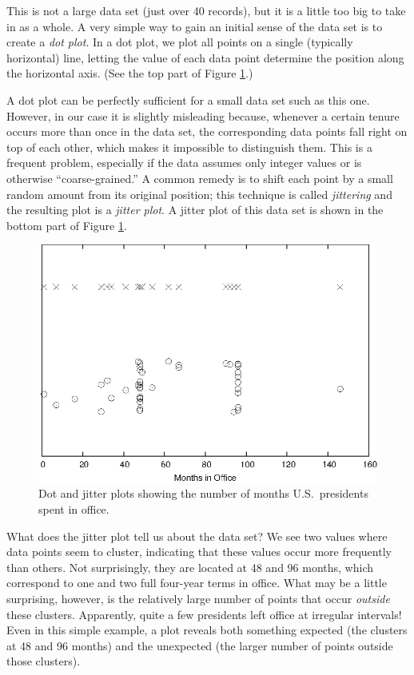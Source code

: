 This is not a large data set (just over 40 records), but it is a
little too big to take in as a whole. A very simple way to gain an
initial sense of the data set is to create a \emph{dot plot}. In a dot
plot, we plot all points on a single (typically horizontal) line,
letting the value of each data point determine the position along the
horizontal axis.  (See the top part of Figure \ref{fig:presidents}.)

A dot plot can be perfectly sufficient for a small data set such as
this one. However, in our case it is slightly misleading because,
whenever a certain tenure occurs more than once in the data set, the
corresponding data points fall right on top of each other, which makes
it impossible to distinguish them. This is a frequent problem,
especially if the data assumes only integer values or is otherwise
``coarse-grained.'' A common remedy is to shift each point by a small
random amount from its original position; this technique is called
\emph{jittering} and the resulting plot is a \emph{jitter plot}. A
jitter plot of this data set is shown in the bottom part of Figure
\ref{fig:presidents}.

\begin{figure}
  \centerline{\includegraphics{img/presidents}}
  \caption{Dot and jitter plots showing the number of months U.S.\
    presidents spent in office.}
  \label{fig:presidents}
\end{figure}

What does the jitter plot tell us about the data set?  We see two
values where data points seem to cluster, indicating that these values
occur more frequently than others. Not surprisingly, they are located
at 48 and 96 months, which correspond to one and two full four-year
terms in office. What may be a little surprising, however, is the
relatively large number of points that occur \emph{outside} these
clusters.  Apparently, quite a few presidents left office at irregular
intervals!  Even in this simple example, a plot reveals both something
expected (the clusters at 48 and 96 months) and the unexpected (the
larger number of points outside those clusters).

